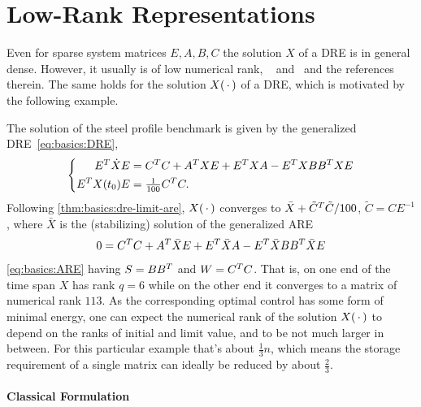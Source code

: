 \section{Low-Rank Representations}
\label{sec:lowrank}

Even for sparse system matrices $E, A, B, C$
the solution $X$ of a \ac{DRE} is in general dense.
However, it usually is of low numerical rank,
\cf \eg~\cite[Section~2.1.4]{Lang2017}
and~\cite[Sections~2.3.3 and~2.3.4]{Kuerschner2016}
and the references therein.
The same holds for the solution $X(\optional{})$ of a \ac{DRE},
which is motivated by the following example.

\begin{example}
  The solution of the steel profile benchmark \cite{morwiki_steel} is given by the generalized \ac{DRE}~\eqref{eq:basics:DRE},
  \begin{equation*}
  \left\{
  \begin{aligned}
    E^T \dot X E &= C^T C + A^T X E + E^T X A - E^T X BB^T X E \\
    E^T X(t_0) E &= \tfrac{1}{100} C^T C
    .
  \end{aligned}
  \right.
  \end{equation*}
  Following \autoref{thm:basics:dre-limit-are},
  $X(\optional{})$ converges to $\bar X + \tilde C^T \tilde C / 100$,
  $\tilde C = C E^{-1}$,
  where $\bar X$ is the (stabilizing) solution of the generalized \ac{ARE}
  \begin{equation*}
    0 = C^T C + A^T \bar X E + E^T \bar X A - E^T \bar X BB^T \bar X E
  \end{equation*}
  \cf \eqref{eq:basics:ARE} having $S = BB^T$ and $W = C^T C$.
  That is, on one end of the time span $X$ has rank $q=6$
  while on the other end it converges to a matrix of numerical rank $113$.
  As the corresponding optimal control has some form of minimal energy,
  one can expect the numerical rank of the solution $X(\optional{})$ to depend on the ranks of initial and limit value,
  and to be not much larger in between.
  For this particular example that's about $\frac{1}{3}n$,
  which means the storage requirement of a single matrix can ideally be reduced by about $\frac{2}{3}$.
\end{example}

\paragraph{Classical Formulation}

